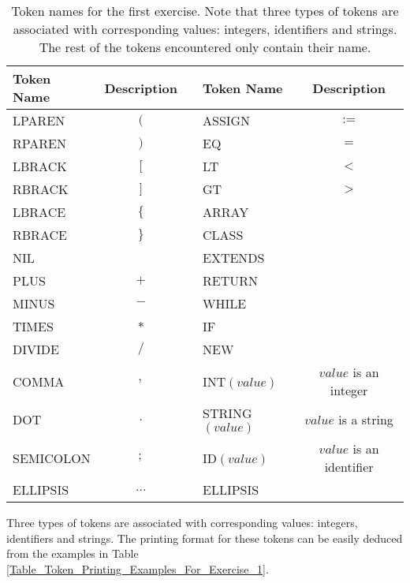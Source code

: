 \documentclass{article}
\begin{document}
\begin{table}[h]
\centering
\begin{tabular}{|l|c|c|l|c|}
\hline
Token Name & Description & & Token Name & Description \\
\hline
\hline
LPAREN    & $($  & & ASSIGN           & $:=$                     \\
RPAREN    & $)$  & & EQ               & $=$                      \\
LBRACK    & $[$  & & LT               & $<$                      \\
RBRACK    & $]$  & & GT               & $>$                      \\
LBRACE    & $\{$ & & ARRAY            &                          \\
RBRACE    & $\}$ & & CLASS            &                          \\
NIL       &      & & EXTENDS          &                          \\
PLUS      & $+$  & & RETURN           &                          \\
MINUS     & $-$  & & WHILE            &                          \\
TIMES     & $*$  & & IF               &                          \\
DIVIDE    & $/$  & & NEW              &                          \\
COMMA     & $,$  & & INT$(value)$     & $value$ is an integer    \\
DOT       & $.$  & & STRING$(value)$  & $value$ is a string      \\
SEMICOLON & $;$  & & ID$(value)$      & $value$ is an identifier \\
ELLIPSIS  & $...$ & & ELLIPSIS & \\
\hline
\end{tabular}
\caption{
Token names for the first exercise.
Note that three types of tokens are associated with corresponding values:
integers, identifiers and strings.
The rest of the tokens encountered only contain their name.
\label{Table_Token_Names_For_Exercise_1}}
\end{table}
Three types of tokens are associated with corresponding values: integers, identifiers and strings.
The printing format for these tokens can be easily deduced from the examples in Table
\ref{Table_Token_Printing_Examples_For_Exercise_1}.
\end{document}

